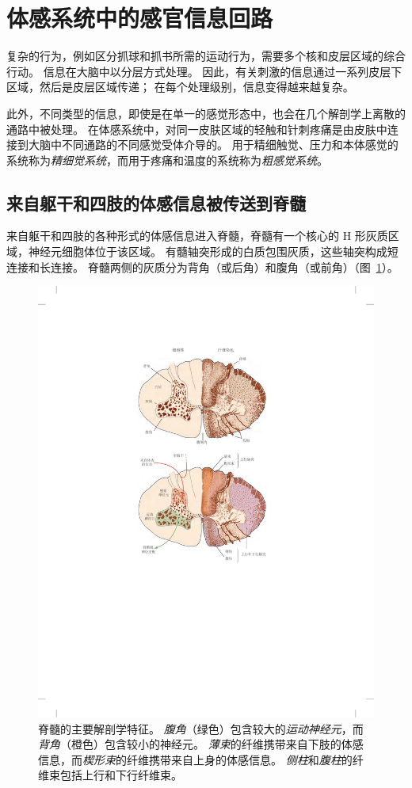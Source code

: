 \section{体感系统中的感官信息回路}

复杂的行为，例如区分抓球和抓书所需的运动行为，需要多个核和皮层区域的综合行动。
信息在大脑中以分层方式处理。
因此，有关刺激的信息通过一系列皮层下区域，然后是皮层区域传递； 
在每个处理级别，信息变得越来越复杂。


此外，不同类型的信息，即使是在单一的感觉形态中，也会在几个解剖学上离散的通路中被处理。 
在体感系统中，对同一皮肤区域的轻触和针刺疼痛是由皮肤中连接到大脑中不同通路的不同感觉受体介导的。 
用于精细触觉、压力和本体感觉的系统称为\textit{精细觉系统}，而用于疼痛和温度的系统称为\textit{粗感觉系统}。



\subsection{来自躯干和四肢的体感信息被传送到脊髓}

来自躯干和四肢的各种形式的体感信息进入脊髓，脊髓有一个核心的 H 形灰质区域，神经元细胞体位于该区域。 
有髓轴突形成的白质包围灰质，这些轴突构成短连接和长连接。
脊髓两侧的灰质分为背角（或后角）和腹角（或前角）（图~\ref{fig:4_3}）。


\begin{figure}[htbp]
	\centering
	\includegraphics[width=0.7\linewidth]{chap04/fig_4_3}
	\caption{脊髓的主要解剖学特征。 
		\textit{腹角}（绿色）包含较大的\textit{运动神经元}，而\textit{背角}（橙色）包含较小的神经元。
		\textit{薄束}的纤维携带来自下肢的体感信息，而\textit{楔形束}的纤维携带来自上身的体感信息。
		\textit{侧柱}和\textit{腹柱}的纤维束包括上行和下行纤维束。}
	\label{fig:4_3}
\end{figure}


